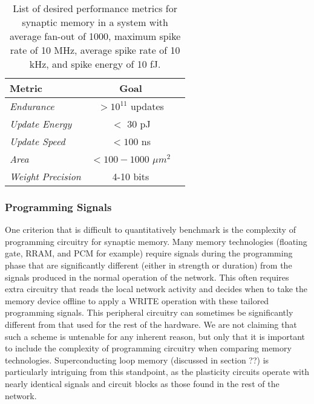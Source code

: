 \documentclass[twocolumn]{article}
\begin{document}
\begin{table}[h!]
  \begin{center}
    \label{tab:memory_metrics}
    \begin{tabular}{l|c|r} %
      \textbf{Metric} & \textbf{Goal} \\
      \hline
      \textit{Endurance} & $>10^{11}$ updates \\
      \textit{Update Energy} & $<$ 30 pJ\\
      \textit{Update Speed} & $<100$ ns \\
      \textit{Area} & $<100-1000$ $\mu m ^2$ \\
      \textit{Weight Precision} & 4-10 bits \cite{pfeil20124}
      
    \end{tabular}
    \caption{List of desired performance metrics for synaptic memory in a system with average fan-out of 1000, maximum spike rate of 10 MHz, average spike rate of 10 kHz, and spike energy of 10 fJ.}
  \end{center}
\end{table}

\subsubsection{Programming Signals}
One criterion that is difficult to quantitatively benchmark is the complexity of programming circuitry for synaptic memory. Many memory technologies (floating gate, RRAM, and PCM for example) require signals during the programming phase that are significantly different (either in strength or duration) from the signals produced in the normal operation of the network. This often requires extra circuitry that reads the local network activity and decides when to take the memory device offline to apply a WRITE operation with these tailored programming signals. This peripheral circuitry can sometimes be significantly different from that used for the rest of the hardware. We are not claiming that such a scheme is untenable for any inherent reason, but only that it is important to include the complexity of programming circuitry when comparing memory technologies. Superconducting loop memory (discussed in section ??) is particularly intriguing from this standpoint, as the plasticity circuits operate with  nearly identical signals and circuit blocks as those found in the rest of the network.
\end{document}
